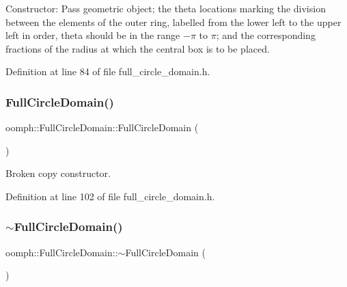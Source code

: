 Constructor\+: Pass geometric object; the theta locations marking the division between the elements of the outer ring, labelled from the lower left to the upper left in order, theta should be in the range $-\pi$ to $\pi$; and the corresponding fractions of the radius at which the central box is to be placed. 



Definition at line 84 of file full\+\_\+circle\+\_\+domain.\+h.

\mbox{\label{classoomph_1_1FullCircleDomain_a36c2bdc01a19f511c97a89f87cd5b7dc}} 
\subsubsection{\texorpdfstring{Full\+Circle\+Domain()}{FullCircleDomain()}\hspace{0.1cm}{\footnotesize\ttfamily [2/2]}}
{\footnotesize\ttfamily oomph\+::\+Full\+Circle\+Domain\+::\+Full\+Circle\+Domain (\begin{DoxyParamCaption}\item[{const \hyperlink{classoomph_1_1FullCircleDomain}{Full\+Circle\+Domain} \&}]{ }\end{DoxyParamCaption})\hspace{0.3cm}{\ttfamily [inline]}}



Broken copy constructor. 



Definition at line 102 of file full\+\_\+circle\+\_\+domain.\+h.

\mbox{\label{classoomph_1_1FullCircleDomain_afbdae044de6d958491a0b1a8cfcbc175}} 
\subsubsection{\texorpdfstring{$\sim$\+Full\+Circle\+Domain()}{~FullCircleDomain()}}
{\footnotesize\ttfamily oomph\+::\+Full\+Circle\+Domain\+::$\sim$\+Full\+Circle\+Domain (\begin{DoxyParamCaption}{ }\end{DoxyParamCaption})\hspace{0.3cm}{\ttfamily [inline]}}




